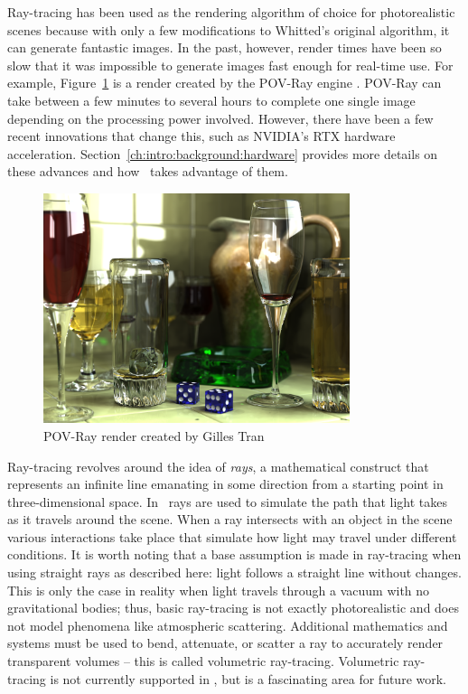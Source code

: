 Ray-tracing has been used as the rendering algorithm of choice for photorealistic scenes because with only a few modifications to Whitted's original algorithm, it can generate fantastic images.
In the past, however, render times have been so slow that it was impossible to generate images fast enough for real-time use.
For example, Figure~\ref{fig:povray_render} is a render created by the POV-Ray engine \cite{povray}.
POV-Ray can take between a few minutes to several hours to complete one single image depending on the processing power involved.
However, there have been a few recent innovations that change this, such as NVIDIA's RTX hardware acceleration.
Section~\ref{ch:intro:background:hardware} provides more details on these advances and how \name\ takes advantage of them.

\begin{figure}[htb]
  \centering
  \includegraphics[width=0.8\textwidth]{resources/glasses_povray}
  \caption{POV-Ray render created by Gilles Tran \cite{povray2006render}}
  \label{fig:povray_render}
\end{figure}

Ray-tracing revolves around the idea of {\it rays}, a mathematical construct that represents an infinite line emanating in some direction from a starting point in three-dimensional space.
In \name\, rays are used to simulate the path that light takes as it travels around the scene.
When a ray intersects with an object in the scene various interactions take place that simulate how light may travel under different conditions.
It is worth noting that a base assumption is made in ray-tracing when using straight rays as described here: light follows a straight line without changes.
This is only the case in reality when light travels through a vacuum with no gravitational bodies; thus, basic ray-tracing is not exactly photorealistic and does not model phenomena like atmospheric scattering.
Additional mathematics and systems must be used to bend, attenuate, or scatter a ray to accurately render transparent volumes -- this is called volumetric ray-tracing.
Volumetric ray-tracing is not currently supported in \name, but is a fascinating area for future work.

